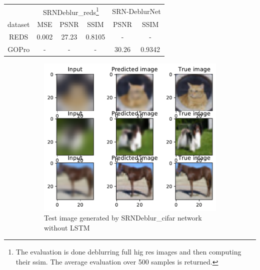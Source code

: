 \begin{tabularx}{300pt}{cccccc}
            & \multicolumn{3}{c}{SRNDeblur\_reds\footnote{The evaluation is done deblurring full hig res images and then computing their ssim. The average evaluation over 500 samples is returned.}} & \multicolumn{2}{c}{SRN-DeblurNet} \\
dataset & MSE & PSNR & SSIM & PSNR & SSIM \\
\hline
REDS & 0.002 & 27.23 & 0.8105 & - & - \\
GOPro & - & - & - & 30.26 & 0.9342 \\
\hline            
\end{tabularx}            
\begin{figure}[H]
    \centering
    \begin{subfigure}{\textwidth}
        \centering
        \includegraphics[height=0.30\textheight]{subsections/srndeblur/cifarnolstmtest.pdf}
        \caption{Test image generated by SRNDeblur\_cifar network without LSTM }
    \end{subfigure} 
    \begin{subfigure}{\textwidth}
        \centering

\end{subfigure}
\end{figure}
